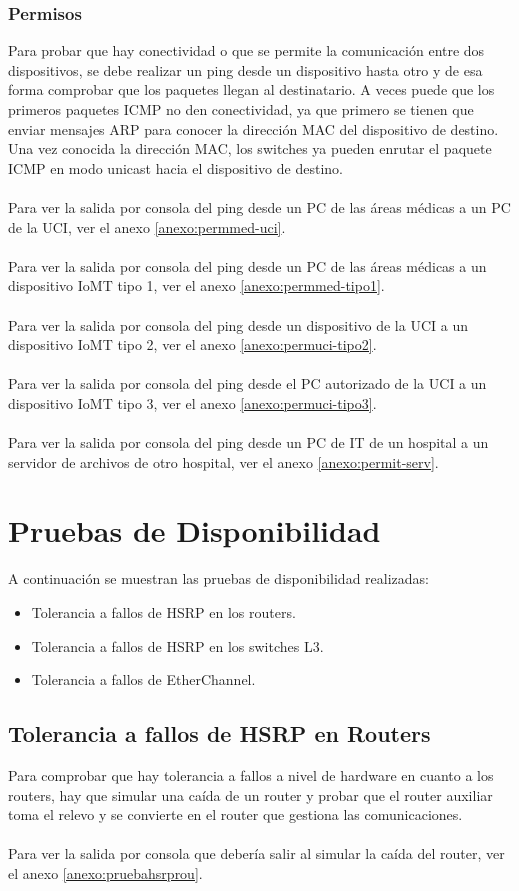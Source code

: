 \subsubsection{Permisos}
Para probar que hay conectividad o que se permite la comunicación entre dos dispositivos, se debe realizar un ping desde un dispositivo hasta otro y de esa forma comprobar que los paquetes llegan al destinatario. A veces puede que los primeros paquetes \ac{ICMP} no den conectividad, ya que primero se tienen que enviar mensajes ARP para conocer la dirección MAC 
del dispositivo de destino. Una vez conocida la dirección MAC, los switches ya pueden enrutar el paquete ICMP en modo unicast hacia el dispositivo de destino.
\\ \\ 
Para ver la salida por consola del ping desde un PC de las áreas médicas a un PC de la UCI, ver el anexo \ref{anexo:permmed-uci}.
\\ \\ 
Para ver la salida por consola del ping desde un PC de las áreas médicas a un dispositivo IoMT tipo 1, ver el anexo \ref{anexo:permmed-tipo1}.
\\ \\ 
Para ver la salida por consola del ping desde un dispositivo de la UCI a un dispositivo IoMT tipo 2, ver el anexo \ref{anexo:permuci-tipo2}.
\\ \\ 
Para ver la salida por consola del ping desde el PC autorizado de la UCI a un dispositivo IoMT tipo 3, ver el anexo \ref{anexo:permuci-tipo3}.
\\ \\ 
Para ver la salida por consola del ping desde un PC de IT de un hospital a un servidor de archivos de otro hospital, ver el anexo \ref{anexo:permit-serv}.

\section{Pruebas de Disponibilidad}
A continuación se muestran las pruebas de disponibilidad realizadas:
\begin{itemize}
    \item Tolerancia a fallos de HSRP en los routers.
    \item Tolerancia a fallos de HSRP en los switches L3.
    \item Tolerancia a fallos de EtherChannel.
\end{itemize}

\subsection{Tolerancia a fallos de HSRP en Routers}
Para comprobar que hay tolerancia a fallos a nivel de hardware en cuanto a los routers, hay que simular una caída de un router y probar que el router auxiliar toma el relevo y se convierte en 
el router que gestiona las comunicaciones.
\\ \\ 
Para ver la salida por consola que debería salir al simular la caída del router, ver el anexo \ref{anexo:pruebahsrprou}.

